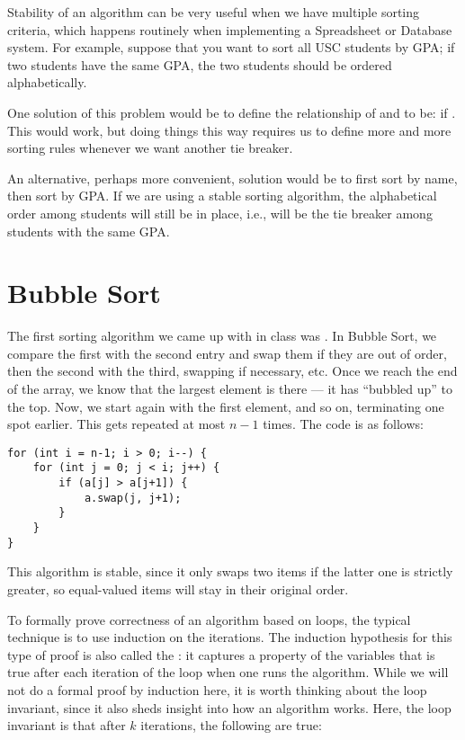 Stability of an algorithm can be very useful when we have multiple sorting
criteria, which happens routinely when implementing a Spreadsheet or
Database system. 
For example, suppose that you want to sort all USC students by GPA;
if two students have the same GPA, the two students should be ordered
alphabetically.

One solution of this problem would be to define the relationship of
 and  to be:
  if .
This would work, but doing things this way requires us to define more
and more sorting rules whenever we want another tie breaker.

An alternative, perhaps more convenient, solution would be to first
sort by name, then sort by GPA. 
If we are using a stable sorting algorithm, the alphabetical
order among students will still be in place, i.e., will be the tie
breaker among students with the same GPA.

\section{Bubble Sort}

The first sorting algorithm we came up with in class was . 
In Bubble Sort, we compare the first with the second entry and swap
them if they are out of order, then the second with the third,
swapping if necessary, etc. Once we reach the end of the array, we
know that the largest element is there --- it has ``bubbled up'' to
the top. Now, we start again with the first element, and so on,
terminating one spot earlier. This gets repeated at most $n-1$ times.
The code is as follows:

\begin{verbatim}
for (int i = n-1; i > 0; i--) {
    for (int j = 0; j < i; j++) {
        if (a[j] > a[j+1]) {
            a.swap(j, j+1);
        }
    }
}
\end{verbatim}

This algorithm is stable, since it only swaps two items if the latter one
is strictly greater, so equal-valued items will stay in their original
order.

To formally prove correctness of an algorithm based on 
loops, the typical technique is to use induction on the iterations.
The induction hypothesis for this type of proof is also called
the : it captures a property of the variables
that is true after each iteration of the loop when one runs the
algorithm. While we will not do a formal proof by induction here,
it is worth thinking about the loop invariant, since it also
sheds insight into how an algorithm works.
Here, the loop invariant is that after $k$ iterations, the following
are true:

